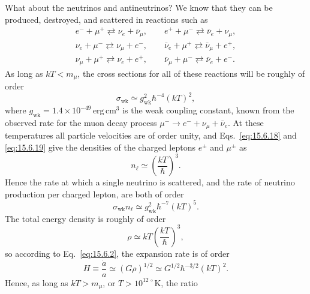 What about the neutrinos and antineutrinos? We know that they can be produced,
destroyed, and scattered in reactions such as
\begin{equation}
  \begin{gathered}
    e^-+\mu^+\rightleftarrows\nu_e+\bar\nu_\mu,
    \qquad
    e^++\mu^-\rightleftarrows\bar\nu_e+\nu_\mu,
    \\
    \nu_e+\mu^-\rightleftarrows\nu_\mu+e^-,
    \qquad
    \bar\nu_e+\mu^+\rightleftarrows\bar\nu_\mu+e^+,
    \\
    \nu_\mu+\mu^+\rightleftarrows\nu_e+e^+,
    \qquad
    \bar\nu_\mu+\mu^-\rightleftarrows\bar\nu_e+e^-.
  \end{gathered}
  \tag{15.6.20}\label{eq:15.6.20}
\end{equation}
As long as \(kT<m_\mu\), the cross sections for all of these reactions will be
roughly of order
\begin{equation}
  \sigma_{\mathrm{wk}}
  \simeq
  g_{\mathrm{wk}}^2\hbar^{-4}(kT)^2,
  \tag{15.6.21}\label{eq:15.6.21}
\end{equation}
where \(g_{\mathrm{wk}}=1.4\times10^{-49}\,\mathrm{erg\,cm^3}\) is the weak
coupling constant, known from the observed rate for the muon decay process
\(\mu^-\to e^-+\nu_\mu+\bar\nu_e\). At these temperatures all particle
velocities are of order unity, and Eqs.~\eqref{eq:15.6.18} and
\eqref{eq:15.6.19} give the densities of the charged leptons \(e^\pm\) and
\(\mu^\pm\) as
\begin{equation}
  n_\ell\simeq\left(\frac{kT}{\hbar}\right)^3.
  \tag{15.6.22}\label{eq:15.6.22}
\end{equation}
Hence the rate at which a single neutrino is scattered, and the rate of
neutrino production per charged lepton, are both of order
\begin{equation}
  \sigma_{\mathrm{wk}}n_\ell
  \simeq
  g_{\mathrm{wk}}^2\hbar^{-7}(kT)^5.
  \tag{15.6.23}\label{eq:15.6.23}
\end{equation}
The total energy density is roughly of order
\begin{equation}
  \rho\simeq kT\left(\frac{kT}{\hbar}\right)^3,
  \tag{15.6.24}\label{eq:15.6.24}
\end{equation}
so according to Eq.~\eqref{eq:15.6.2}, the expansion rate is of order
\begin{equation}
  H\equiv\frac{\dot a}{a}
  \simeq
  (G\rho)^{1/2}
  \simeq
  G^{1/2}\hbar^{-3/2}(kT)^2.
  \tag{15.6.25}\label{eq:15.6.25}
\end{equation}
Hence, as long as \(kT>m_\mu\), or \(T>10^{12\,\circ}\mathrm K\), the ratio
